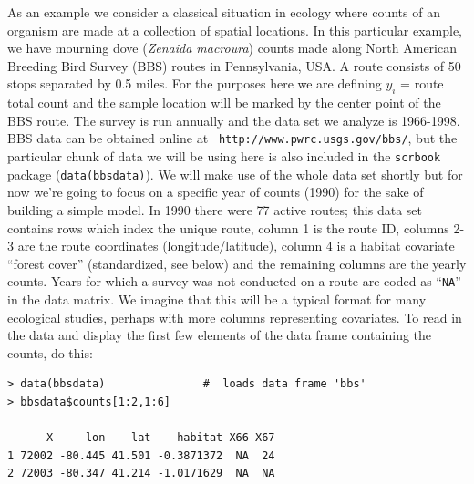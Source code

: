 As an example we consider a classical situation in ecology where
counts of an organism are made at a collection of spatial
locations. In this particular example, we have mourning dove 
({\it Zenaida macroura})
counts
made along North American Breeding Bird Survey (BBS) routes in
Pennsylvania, USA. A route consists of 50 stops separated by 0.5
miles. For the purposes here we are defining $y_i$ = route total count
and the sample location will be marked by the center point of the BBS
route.  The survey is run annually and the data set we analyze is
1966-1998. BBS data can be obtained online at \mbox{\tt
  http:\//\//www.pwrc.usgs.gov\//bbs\//}, but the particular chunk of
data we will be using here is also included in the {\tt scrbook}
package ({\tt data(bbsdata)}).
We will make use of the whole data set shortly but for now we're going
to focus on a specific year of counts (1990) for the sake of
building a simple model.
In 1990 there were 77 active routes; this data set contains rows which index the unique route, column 1 is the
route ID, columns 2-3 are the route coordinates (longitude/latitude),
column 4 is a habitat covariate ``forest cover'' (standardized, see
below) and the remaining columns are the yearly counts. Years for
which a survey was not conducted on a route are coded as ``\mbox{\tt NA}'' in the data matrix. We
imagine that this will be a typical format for many ecological
studies, perhaps with more columns representing covariates.  To read
in the data and display the first few elements of the data frame containing the counts, do
this:
{\small
\begin{verbatim}
> data(bbsdata)               #  loads data frame 'bbs'
> bbsdata$counts[1:2,1:6]

      X     lon    lat    habitat X66 X67
1 72002 -80.445 41.501 -0.3871372  NA  24
2 72003 -80.347 41.214 -1.0171629  NA  NA
\end{verbatim}
}

